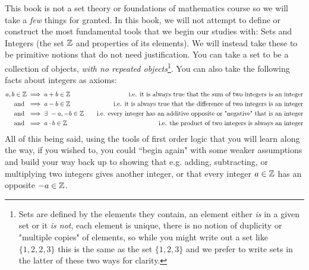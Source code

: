This book is not a set theory or foundations of mathematics course so we will take a \textit{few} things for granted. In this book, we will not attempt to define or construct the most fundamental tools that we begin our studies with: Sets and Integers (the set ${\mathbb{ Z}}$ and properties of its elements). We will instead take these to be primitive notions that do not need justification. You can take a set to be a collection of objects, \textit{with no repeated objects}\footnote{Sets are defined by the elements they contain, an element either \textit{is} in a given set or it \textit{is not}, each element is unique, there is no notion of duplicity or "multiple copies" of elements, so while you might write out a set like $\{1, 2, 2, 3\}$ this is the same as the set $\{1,2,3\}$ and we prefer to write sets in the latter of these two ways for clarity.}. You can also take the following facts about integers as axioms:
\noindent\begin{align}
    a,b\in \Z &\implies a+b\in \Z  \ \ \ &\text{i.e. it is always true that the sum of two integers is an integer}\nonumber \\
    \text{ and } &\implies a-b\in \Z \ \ \ &\text{i.e. it is always true that the difference of two integers is an integer}\nonumber \\
    \text{ and } &\implies \exists \ -a,-b \in \Z \ \ \ &\text{i.e. every integer has an additive opposite or "negative" that is an integer}\nonumber \\
     \text{ and } &\implies a\cdot b\in \Z \ \ \ &\text{i.e. the product of two integers is always an integer}\nonumber
\end{align} 
All of this being said, using the tools of first order logic that you will learn along the way, if you wished to, you could ``begin again" with some weaker assumptions and build your way back up to showing that e.g. adding, subtracting, or multiplying two integers gives another integer, or that every integer $a\in{\mathbb{ Z}}$ has an opposite $-a\in{\mathbb{ Z}}$. 

